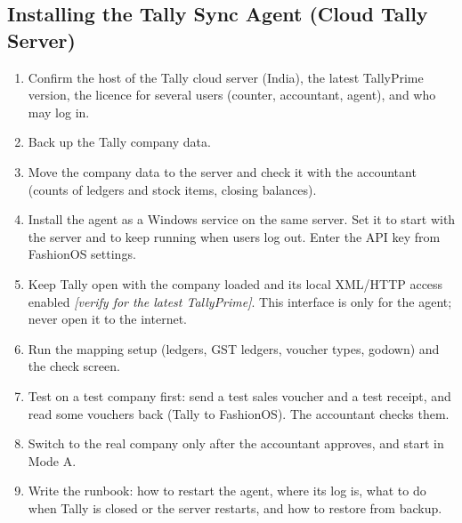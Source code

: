 \documentclass[11pt,a4paper]{article}
\newcommand{\todo}[1]{\textit{[#1]}}
\begin{document}
\subsection{Installing the Tally Sync Agent (Cloud Tally Server)}
\begin{enumerate}
\item Confirm the host of the Tally cloud server (India), the latest TallyPrime version, the licence for several users (counter, accountant, agent), and who may log in.
\item Back up the Tally company data.
\item Move the company data to the server and check it with the accountant (counts of ledgers and stock items, closing balances).
\item Install the agent as a Windows service on the same server. Set it to start with the server and to keep running when users log out. Enter the API key from FashionOS settings.
\item Keep Tally open with the company loaded and its local XML/HTTP access enabled \todo{verify for the latest TallyPrime}. This interface is only for the agent; never open it to the internet.
\item Run the mapping setup (ledgers, GST ledgers, voucher types, godown) and the check screen.
\item Test on a test company first: send a test sales voucher and a test receipt, and read some vouchers back (Tally to FashionOS). The accountant checks them.
\item Switch to the real company only after the accountant approves, and start in Mode A.
\item Write the runbook: how to restart the agent, where its log is, what to do when Tally is closed or the server restarts, and how to restore from backup.
\end{enumerate}
\end{document}
